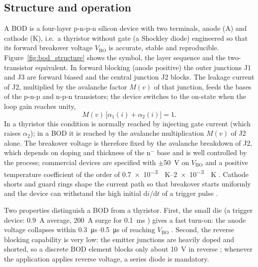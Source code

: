 \documentclass[11pt,a4paper]{article}
\newcommand{\Vbo}{V_{\mathrm{BO}}}
\begin{document}
\subsection{Structure and operation}
A BOD is a four-layer p-n-p-n silicon device with two terminals, anode (A) and cathode (K), i.e.\ a thyristor without gate (a Shockley diode) engineered so that its forward breakover voltage $\Vbo$ is accurate, stable and reproducible. Figure~\ref{fig:bod_structure} shows the symbol, the layer sequence and the two-transistor equivalent. In forward blocking (anode positive) the outer junctions J1 and J3 are forward biased and the central junction J2 blocks. The leakage current of J2, multiplied by the avalanche factor $M(v)$ of that junction, feeds the bases of the p-n-p and n-p-n transistors; the device switches to the on-state when the loop gain reaches unity,
\begin{equation}
M(v)\,\bigl[\alpha_{1}(i)+\alpha_{2}(i)\bigr] = 1 .
\label{eq:breakover}
\end{equation}
In a thyristor this condition is normally reached by injecting gate current (which raises $\alpha_2$); in a BOD it is reached by the avalanche multiplication $M(v)$ of J2 alone. The breakover voltage is therefore fixed by the avalanche breakdown of J2, which depends on doping and thickness of the n$^-$ base and is well controlled by the process; commercial devices are specified with $\pm$\SI{50}{V} on $\Vbo$ and a positive temperature coefficient of the order of \SIrange{0.7e-3}{2e-3}{\per\kelvin} \cite{ixbod2,ixbod1}. Cathode shorts and guard rings shape the current path so that breakover starts uniformly and the device can withstand the high initial $\mathrm{d}i/\mathrm{d}t$ of a trigger pulse \cite{ixyspatent}.

Two properties distinguish a BOD from a thyristor. First, the small die (a trigger device: \SI{0.9}{A} average, \SI{200}{A} surge for \SI{0.1}{ms} \cite{ixbod2}) gives a fast turn-on: the anode voltage collapses within \SIrange{0.3}{0.5}{\micro\second} of reaching $\Vbo$ \cite{ixyspatent}. Second, the reverse blocking capability is very low: the emitter junctions are heavily doped and shorted, so a discrete BOD element blocks only about \SI{10}{V} in reverse \cite{ixysapp}; whenever the application applies reverse voltage, a series diode is mandatory.
\end{document}
